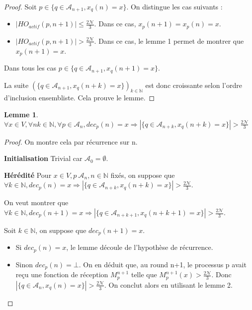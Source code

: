 \documentclass{article}
\newtheorem{lemma}{Lemme}
\begin{document}
\begin{proof}

Soit $p \in  \{ q \in \mathcal{A}_{n+1} , x_q(n) = x \} $. On distingue les cas suivants :

\begin{itemize}

\item $|HO_{actif} (p, n+1) | \leq \frac{2\mathcal{N}}{3}$. Dans ce cas, $x_p(n+1) = x_p(n) = x$.
\item $|HO_{actif} (p, n+1) | > \frac{2\mathcal{N}}{3}$. Dans ce cas, le lemme 1 permet de montrer que $x_p(n+1) = x$.

\end{itemize}
Dans tous les cas 
	$p \in \{ q \in \mathcal{A}_{n+1} , x_q(n+1) = x \} $.

	La suite $(\{ q \in \mathcal{A}_{n+1} , x_q(n+k) = x \})_{k \in \mathds{N}}$ est donc croissante selon l'ordre d'inclusion ensembliste. Cela prouve le lemme.
\end{proof}
\begin{lemma}
	$\forall x \in V, \forall n k \in \mathds{N}, \forall p \in \mathcal{A}_n, dec_p(n) = x \Rightarrow| \{ q \in \mathcal{A}_{n+k} , x_q(n+k) = x \} | > \frac{2\mathcal{N}}{3}$
\end{lemma}
\begin{proof}

On montre cela par récurrence sur n.

\textbf{Initialisation}
	Trivial car $\mathcal{A}_0 = \emptyset$.

\textbf{Hérédité}
	Pour $x \in V, p \ \mathcal{A}_n, n \in \mathds{N}$ fixés, on suppose que 
	$ \forall k \in \mathds{N}, dec_p(n) = x \Rightarrow| \{ q \in \mathcal{A}_{n+k} , x_q(n+k) = x \} | > \frac{2\mathcal{N}}{3}$.

	On veut montrer que 
	$ \forall k \in \mathds{N}, dec_p(n+1) = x \Rightarrow| \{ q \in \mathcal{A}_{n+k+1} , x_q(n+k+1) = x \} | > \frac{2\mathcal{N}}{3}$.

	Soit $k \in \mathds{N}$, on suppose que $dec_p(n+1) = x$.

	\begin{itemize}

		\item Si $dec_p(n) = x$, le lemme découle de l'hypothèse de récurrence.
		\item Sinon $dec_p(n) = \bot$. On en déduit que, au round n+1, le processus p avait reçu une fonction de réception $M_p^{n+1}$ telle que $M_p^{n+1}(x) > \frac{2\mathcal{N}}{3}$.
			Donc $| \{ q \in \mathcal{A}_n , x_q(n) = x \} | > \frac{2\mathcal{N}}{3}$.
			On conclut alors en utilisant le lemme 2.

	\end{itemize}
\end{proof}
\end{document}
